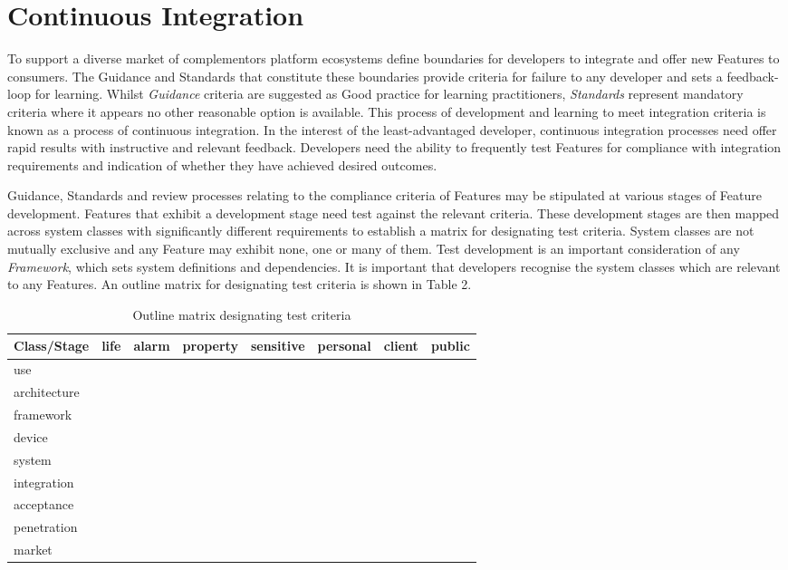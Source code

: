 \documentclass[11pt, oneside]{book}   	%
\begin{document}
\pagebreak

\chapter{Continuous Integration}
To support a diverse market of complementors platform ecosystems define boundaries for developers to integrate and offer new Features to consumers.
The Guidance and Standards that constitute these boundaries provide criteria for failure to any developer and sets a feedback-loop for learning.
Whilst \emph{Guidance} criteria are suggested as Good practice for learning practitioners, \emph{Standards} represent mandatory criteria where it appears no other reasonable option is available.
This process of development and learning to meet integration criteria is known as a process of continuous integration.
In the interest of the least-advantaged developer, continuous integration processes need offer rapid results with instructive and relevant feedback.
Developers need the ability to frequently test Features for compliance with integration requirements and indication of whether they have achieved desired outcomes.\

Guidance, Standards and review processes relating to the compliance criteria of Features may be stipulated at various stages of Feature development.
Features that exhibit a development stage need test against the relevant criteria.
These development stages are then mapped across system classes with significantly different requirements to establish a matrix for designating test criteria.
System classes are not mutually exclusive and any Feature may exhibit none, one or many of them.
Test development is an important consideration of any \emph{Framework}, which sets system definitions and dependencies.
It is important that developers recognise the system classes which are relevant to any Features.
An outline matrix for designating test criteria is shown in Table 2.

\pagebreak

\FloatBarrier
\begin{table}
	\caption{Outline matrix designating test criteria}
	\begin{center}
		\begin{tabular}{| l | c | c | c | c | c | c | c |}
		\hline
		Class/Stage&life&alarm&property&sensitive&personal&client&public\\
		\hline
		use&&&&&&&\\
		architecture&&&&&&&\\
		framework&&&&&&&\\
		device&&&&&&&\\
		system&&&&&&&\\
		integration&&&&&&&\\
		acceptance&&&&&&&\\
		penetration&&&&&&&\\
		market&&&&&&&\\
		\hline
		\end{tabular}
	\end{center}
	\label{Test matrix}
\end{table}
\FloatBarrier
\end{document}
